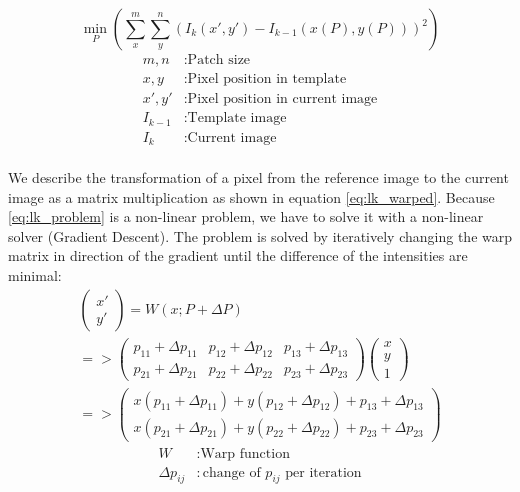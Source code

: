 \documentclass[11pt,a4paper,titlepage,oneside]{report}
\begin{document}
\begin{equation}\label{eq:lk_problem}
  \min_P(\sum_x^m\sum_y^n(I_{k}(x',y')-I_{k-1}(x(P),y(P)))^2)
\end{equation}
\begin{align*}
  m,n       &: \text{Patch size}\\
  x,y       &: \text{Pixel position in template}\\
  x',y'     &: \text{Pixel position in current image}\\
  I_{k-1}   &: \text{Template image}\\
  I_{k}     &: \text{Current image}\\
\end{align*}

We describe the transformation of a pixel from the reference image to the current image as a matrix multiplication as shown in equation \ref{eq:lk_warped}. Because \ref{eq:lk_problem} is a non-linear problem, we have to solve it with a non-linear solver (Gradient Descent). The problem is solved by iteratively changing the warp matrix in direction of the gradient until the difference of the intensities are minimal:
\begin{equation}\label{eq:lk_warped}
  \begin{gathered}
    \begin{pmatrix}
      x' \\
      y'
    \end{pmatrix}=
    W(x;P+\Delta P)\\
    =>
    \begin{pmatrix}
      p_{11}+\Delta p_{11} & p_{12}+\Delta p_{12} & p_{13}+\Delta p_{13} \\
      p_{21}+\Delta p_{21} & p_{22}+\Delta p_{22} & p_{23}+\Delta p_{23}
    \end{pmatrix}
    \begin{pmatrix}
      x\\
      y\\
      1
    \end{pmatrix}\\
    =>
    \begin{pmatrix}
      x(p_{11}+\Delta p_{11}) + y(p_{12}+\Delta p_{12}) + p_{13}+\Delta p_{13} \\
      x(p_{21}+\Delta p_{21}) + y(p_{22}+\Delta p_{22}) + p_{23}+\Delta p_{23}
    \end{pmatrix}
  \end{gathered}
\end{equation}
\begin{align*}
  W               &: \text{Warp function}\\
  \Delta p_{ij}   &: \text{change of $p_{ij}$ per iteration}
\end{align*}
\end{document}
